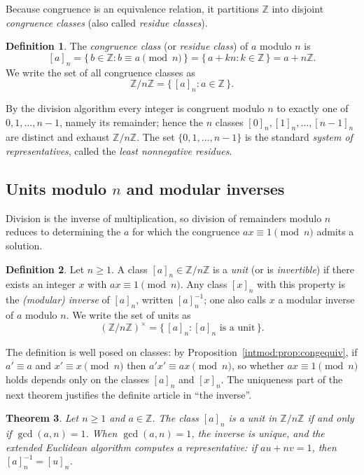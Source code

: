\documentclass[11pt,a4paper]{article}
\newtheorem{theorem}{Theorem}[section]
\theoremstyle{definition}
\newtheorem{definition}[theorem]{Definition}
\theoremstyle{remark}
\newcommand{\Z}{\ensuremath{\mathbb{Z}}}
\begin{document}
Because congruence is an equivalence relation, it partitions \(\Z\) into
disjoint \emph{congruence classes} (also called \emph{residue classes}).

\begin{definition}\label{intmod:def:residueclass}
The \emph{congruence class} (or \emph{residue class}) of \(a\) modulo \(n\) is
\[
[a]_n = \{\, b\in\Z : b\equiv a \pmod n \,\} = \{\, a+kn : k\in\Z \,\}
= a+n\Z.
\]
We write the set of all congruence classes as
\[
\Z/n\Z = \{\, [a]_n : a\in\Z \,\}.
\]
\end{definition}

By the division algorithm every integer is congruent modulo \(n\) to exactly
one of \(0,1,\dots,n-1\), namely its remainder; hence the \(n\) classes
\([0]_n,[1]_n,\dots,[n-1]_n\) are distinct and exhaust \(\Z/n\Z\). The set
\(\{0,1,\dots,n-1\}\) is the standard \emph{system of representatives}, called
the \emph{least nonnegative residues}.

\subsection{Units modulo \texorpdfstring{\(n\)}{n} and modular
inverses}\label{intmod:sub:units}

Division is the inverse of multiplication, so division of remainders modulo
\(n\) reduces to determining the \(a\) for which the congruence
\(ax\equiv 1\pmod n\) admits a solution.

\begin{definition}\label{intmod:def:unit}
Let \(n\ge 1\). A class \([a]_n\in\Z/n\Z\) is a \emph{unit} (or is
\emph{invertible}) if there exists an integer \(x\) with
\(ax\equiv 1\pmod n\). Any class \([x]_n\) with this property is the
\emph{(modular) inverse} of \([a]_n\), written \([a]_n^{-1}\); one also calls
\(x\) a modular inverse of \(a\) modulo \(n\). We write the set of units as
\[
(\Z/n\Z)^\times = \{\, [a]_n : [a]_n \text{ is a unit} \,\}.
\]
\end{definition}

The definition is well posed on classes: by
Proposition~\ref{intmod:prop:congequiv}, if \(a'\equiv a\) and
\(x'\equiv x\pmod n\) then \(a'x'\equiv ax\pmod n\), so whether
\(ax\equiv 1\pmod n\) holds depends only on the classes \([a]_n\) and
\([x]_n\). The uniqueness part of the next theorem justifies the definite
article in ``the inverse''.

\begin{theorem}\label{intmod:thm:unitiff}
Let \(n\ge 1\) and \(a\in\Z\). The class \([a]_n\) is a unit in \(\Z/n\Z\) if
and only if \(\gcd(a,n)=1\). When \(\gcd(a,n)=1\), the inverse is unique, and
the extended Euclidean algorithm computes a representative: if \(au+nv=1\),
then \([a]_n^{-1}=[u]_n\).
\end{theorem}
\end{document}
